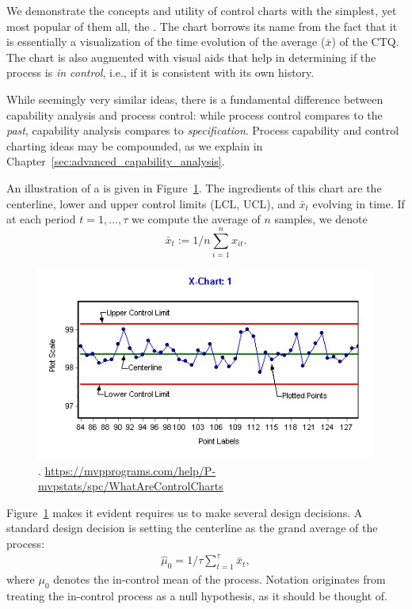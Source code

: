 We demonstrate the concepts and utility of control charts with the simplest, yet most popular of them all, the \barxChart. 
The chart borrows its name from the fact that it is essentially a visualization of the time evolution of the average ($\bar{x}$) of the CTQ. 
The chart is also augmented with visual aids that help in determining if the process is \emph{in control}, i.e., if it is consistent with its own history. 

\begin{remark}
While seemingly very similar ideas, there is a fundamental difference between capability analysis and process control:  while process control compares to the \emph{past}, capability analysis compares to \emph{specification}.
Process capability and control charting ideas may be compounded, as we explain in Chapter~\ref{sec:advanced_capability_analysis}.
\end{remark}


An illustration of a \barxChart is given in Figure~\ref{fig:bar_x_chart}. 
The ingredients of this chart are the centerline, lower and upper control limits (LCL, UCL), and $\bar{x}_t$ evolving in time. 
If at each period $t=1,\dots,\tau$ we compute the average of $n$ samples, we denote $$\bar{x}_t:=1/n \sum_{i=1}^n x_{it}.$$

\begin{figure}[ht]
\centering
\includegraphics[height=0.3\textheight]{art/X-chartExample}
\caption[\barxChart]{\barxChart. \newline \url{https://mvpprograms.com/help/P-mvpstats/spc/WhatAreControlCharts}}
\label{fig:bar_x_chart}
\end{figure}



Figure~\ref{fig:bar_x_chart} makes it evident \barxChart requires us to make several design decisions.
A standard design decision is setting the centerline as the grand average of the process: 
\begin{align}
\label{eq:centerline}
	\hat{\mu}_0=1/\tau \sum_{t=1}^\tau \bar{x}_t,
\end{align}
where $\mu_0$ denotes the in-control mean of the process. 
Notation originates from treating the in-control process as a null hypothesis, as it should be thought of.


